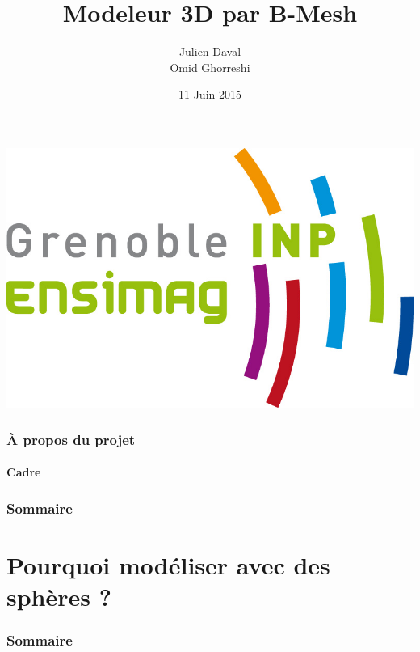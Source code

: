 \documentclass[9pt]{beamer}
\title{Modeleur 3D par B-Mesh}
\author{Julien Daval \\ Omid Ghorreshi}
\institute[Ensimag 2A]{2ème année Ensimag}
\date{11 Juin 2015}
\begin{document}
\begin{frame}
	\titlepage
	\begin{center}
		\includegraphics[scale=0.3]{images/ensimag.jpg}	
	\end{center}

\end{frame}

\begin{frame}
	\frametitle{À propos du projet}
	\framesubtitle{Cadre}
\end{frame}


\begin{frame}
	\frametitle{Sommaire}
	\tableofcontents
\end{frame}

\section{Pourquoi modéliser avec des sphères ?}

\begin{frame}
	\frametitle{Sommaire}
	\tableofcontents[currentsection]
\end{frame}
\end{document}
